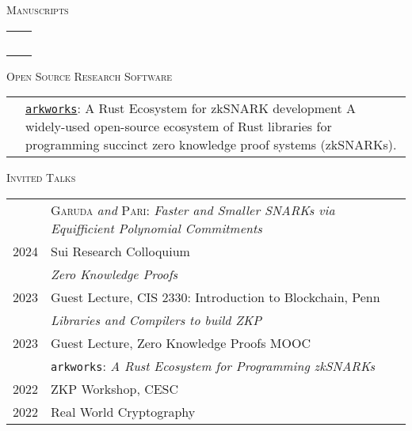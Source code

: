 \documentclass[11pt]{article}
\newenvironment{SectionTable}[1]{
	\renewcommand*{\arraystretch}{1.7}
	\setlength{\tabcolsep}{6pt}
  {\Large \textsc{#1}}
	\begin{longtable}{Rp{5.4in}}}
{\end{longtable}\vspace{-0.2cm}}
\newenvironment{SectionTableSingleSpace}[1]{
	\renewcommand*{\arraystretch}{1.2}
	\setlength{\tabcolsep}{6pt}
  {\Large \textsc{#1}}
	\begin{longtable}{Rp{5.4in}}}
{\end{longtable}\vspace{-0.2cm}}
\begin{document}
\begin{cv}{\vspace{-5em}}
  \begin{refsection}
    \newrefcontext[labelprefix=P] %
    \begin{SectionTable}{Manuscripts}
      \cite{BunzMNW24b} &  \\
      \cite{DellepereMS24} &  \\
      \cite{HuMWXYZ24} &  \\
      \cite{FalkMS24} &  \\
      \cite{BawejaMMNW24} &  \\
    \end{SectionTable}
    \newsavebox\preprintbib
    \savebox{}
  \end{refsection}
  
  \begin{SectionTable}{Open Source Research Software}
    & 
    \href{https://github.com/arkworks-rs}{\texttt{arkworks}}: A Rust Ecosystem for zkSNARK development \newline
    A widely-used open-source ecosystem of Rust libraries for programming succinct zero knowledge proof systems (zkSNARKs).
  \end{SectionTable}
  
  \begin{SectionTableSingleSpace}{Invited Talks}
    & \textsc{Garuda} \emph{and} \textsc{Pari}: \emph{Faster and Smaller SNARKs via Equifficient Polynomial Commitments}\\
    2024 & Sui Research Colloquium\\[0.4em]

    & \emph{Zero Knowledge Proofs} \\
    2023 & Guest Lecture, CIS 2330: Introduction to Blockchain, Penn\\[0.4em]
    
    & \emph{Libraries and Compilers to build ZKP}\\
    2023 & Guest Lecture, Zero Knowledge Proofs MOOC\\[0.4em]

    & \texttt{arkworks}: \emph{A Rust Ecosystem for Programming zkSNARKs} \\
    2022 & ZKP Workshop, CESC \\
    2022 & Real World Cryptography \\[0.4em]


\end{SectionTableSingleSpace}
\end{cv}
\end{document}
